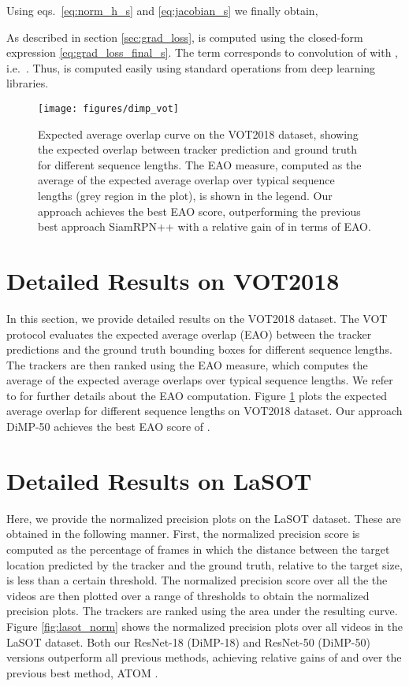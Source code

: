\documentclass[10pt,twocolumn,letterpaper]{article}
\begin{document}
Using eqs.~\eqref{eq:norm_h_s} and \eqref{eq:jacobian_s} we finally obtain,

As described in section \ref{sec:grad_loss},  is computed using the closed-form expression \eqref{eq:grad_loss_final_s}. The term  corresponds to convolution of  with , i.e.\ . Thus,  is computed easily using standard operations from deep learning libraries.


\begin{figure}[t]
	\centering \newcommand{\wid}{0.95\columnwidth}\texttt{[image: figures/dimp\_vot]}\vspace{-0mm}\caption{Expected average overlap curve on the VOT2018 dataset, showing the expected overlap between tracker prediction and ground truth for different sequence lengths. The EAO measure, computed as the average of the expected average overlap over typical sequence lengths (grey region in the plot), is shown in the legend. Our approach achieves the best EAO score, outperforming the previous best approach SiamRPN++ \cite{SiamRPN++} with a relative gain of  in terms of EAO. 
	}\label{fig:vot_eao}\end{figure}

\section{Detailed Results on VOT2018}
\label{sec:VOT2018}

In this section, we provide detailed results on the VOT2018 \cite{VOT2018} dataset. The VOT protocol evaluates the expected average overlap (EAO) between the tracker predictions and the ground truth bounding boxes for different sequence lengths. The trackers are then ranked using the EAO measure, which computes the average of the  expected average overlaps over typical sequence lengths. We refer to \cite{VOT2015} for further details about the EAO computation. Figure \ref{fig:vot_eao} plots the expected average overlap for different sequence lengths on VOT2018 dataset. Our approach DiMP-50 achieves the best EAO score of . 


\section{Detailed Results on LaSOT}
\label{sec:LaSOT}

Here, we provide the normalized precision plots on the LaSOT \cite{LaSOT} dataset. These are obtained in the following manner. First, the normalized precision score  is computed as the percentage of frames in which the distance between the target location predicted by the tracker and the ground truth, relative to the target size, is less than a certain threshold. The normalized precision score over all the the videos are then plotted over a range of thresholds  to obtain the normalized precision plots. The trackers are ranked using the area under the resulting curve. Figure \ref{fig:lasot_norm} shows the normalized precision plots over all  videos in the LaSOT dataset. Both our ResNet-18 (DiMP-18) and ResNet-50 (DiMP-50) versions outperform all previous methods, achieving relative gains of  and  over the previous best method, ATOM \cite{ATOM}.
\end{document}
